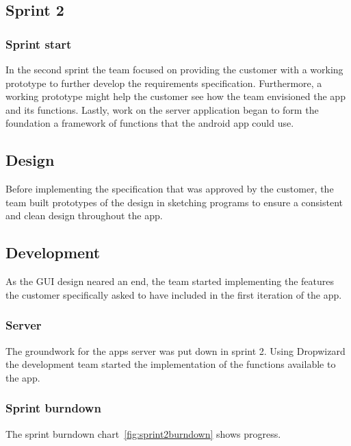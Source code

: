 \subsection{Sprint 2}

\subsubsection{Sprint start}
In the second sprint the team focused on providing the customer with a working
prototype to further develop the requirements specification. Furthermore, a
working prototype might help the customer see how the team envisioned the app
and its functions. Lastly, work on the server application began to form the
foundation a framework of functions that the android app could use.

\subsection{Design}
Before implementing the specification that was approved by the customer, the
team built prototypes of the design in sketching programs to ensure a consistent
and clean design throughout the app. 

\subsection{Development}
As the GUI design neared an end, the team started implementing the features the
customer specifically asked to have included in the first iteration of the app.

\subsubsection{Server}
The groundwork for the apps server was put down in sprint 2. Using Dropwizard
the development team started the implementation of the functions available to
the app.

\subsubsection{Sprint burndown}

The sprint burndown chart~\ref{fig:sprint2burndown} shows progress.

